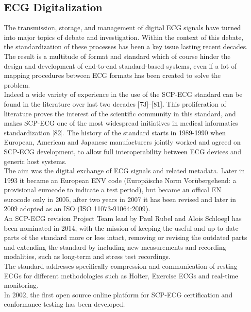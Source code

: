 \subsection{ECG Digitalization}
The transmission, storage, and management of digital ECG signals have turned into major topics of debate and investigation. Within the context of this debate, the standardization of these processes has been a key issue lasting recent decades. \cite{trigo} The result is a multitude of format and standard which of course hinder the design and development of end-to-end standard-based systems, even if a lot of mapping procedures between ECG formats has been created to solve the problem.\\
Indeed a wide variety of experience in the use of the SCP-ECG standard can be found in the literature over last two decades [73]–[81]. This proliferation of literature proves the interest of the scientific community in this standard, and makes SCP-ECG one of the most widespread initiatives in medical informatics standardization [82].
The history of the standard starts in 1989-1990 when European, American and Japanese manufacturers jointly worked and agreed on SCP-ECG development, to allow full interoperability between ECG devices and generic host systems.\\
The aim was the digital exchange of ECG signals and related metadata.
Later in 1993 it became an European ENV code (Europäische Norm Vorübergehend: a provisional eurocode to indicate a test period), but became an offical EN eurocode only in 2005, after two years in 2007 it has been revised and later in 2009 adopted as an ISO (ISO 11073-91064:2009).\\
An SCP-ECG revision Project Team lead by Paul Rubel and Alois Schloegl has been nominated in 2014, with the mission of keeping the useful and up-to-date parts of the standard more or less intact, removing or revising the outdated parts and extending the standard by including new measurements and recording modalities, such as long-term and stress test recordings.\cite{danilopani}\\
The standard addresses specifically compression and communication of resting ECGs for different methodologies such as Holter, Exercise ECGs and real-time monitoring.\\
In 2002, the first open source online platform for SCP-ECG certification and conformance testing has been developed.\cite{Chronaki}\\

